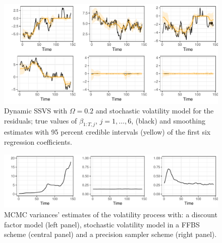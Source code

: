\documentclass[
  12pt,
]{book}
\theoremstyle{break}
\theoremstyle{nonumberplain}
\begin{document}
\begin{figure}[H]

{\centering \includegraphics{Dynamic-Shrinkage-in-Bayesian-Structural-Time-Series-and-Vector-Autoregressive-Models_files/figure-latex/myfig4-1} 

}

\caption{Dynamic SSVS with $\Omega=0.2$ and stochastic volatility model for the residuals; true values of $\beta_{1:T, j}$, $j=1, \ldots, 6$, (black) and smoothing estimates with 95 percent credible intervals (yellow) of the first six regression coefficients.}\label{fig:myfig4}
\end{figure}

\begin{figure}[H]

{\centering \includegraphics{Dynamic-Shrinkage-in-Bayesian-Structural-Time-Series-and-Vector-Autoregressive-Models_files/figure-latex/myfig5-1} 

}

\caption{MCMC variances' estimates of the volatility process with: a discount factor model (left panel), stochastic volatility model in a FFBS scheme (central panel) and a precision sampler scheme (right panel).}\label{fig:myfig5}
\end{figure}
\end{document}
